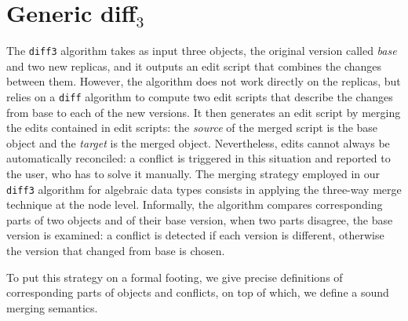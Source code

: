 \documentclass{sigplanconf}
\theoremstyle{plain}
\begin{document}
\section{Generic diff$_3$}
\label{sec:generic-diff3}
The \texttt{diff3} algorithm takes as input three objects, the
original version called \emph{base} and two new replicas, and it
outputs an edit script that combines the changes between them.
%
However, the algorithm does not work directly on the replicas, but
relies on a \texttt{diff} algorithm to compute two edit scripts that
describe the changes from base to each of the new versions.
%
It then generates an edit script by merging the edits contained in
edit scripts: the \emph{source} of the merged script is the base
object and the \emph{target} is the merged object.
%
Nevertheless, edits cannot always be automatically reconciled: a
conflict is triggered in this situation and reported to the user, who
has to solve it manually. 
%
%
The merging strategy employed in our \texttt{diff3} algorithm for
algebraic data types consists in applying the three-way merge
technique at the node level.
%
Informally, the algorithm compares corresponding parts of two objects
and of their base version, when two parts disagree, the base version
is examined: a conflict is detected if each version is different,
otherwise the version that changed from base is chosen.
	
To put this strategy on a formal footing, we give precise definitions
of corresponding parts of objects and conflicts, on top of which, we
define a sound merging semantics.
\end{document}
